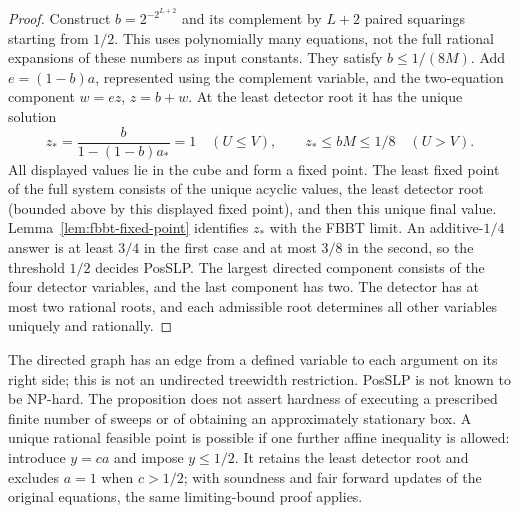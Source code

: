 \begin{proof}
Construct $b=2^{-2^{L+2}}$ and its complement by $L+2$ paired squarings
starting from $1/2$. This uses polynomially many equations, not the full
rational expansions of these numbers as input constants. They satisfy
$b\le1/(8M)$. Add $e=(1-b)a$, represented using the complement variable,
and the two-equation component $w=ez$, $z=b+w$.
At the least detector root it has the unique solution
\[
 z_*=\frac{b}{1-(1-b)a_*}
 =1\quad(U\le V),\qquad z_*\le bM\le1/8\quad(U>V).
\]
All displayed values lie in the cube and form a fixed point. The least
fixed point of the full system consists of the unique acyclic values,
the least detector root (bounded above by this displayed fixed point),
and then this unique final value. Lemma~\ref{lem:fbbt-fixed-point} identifies $z_*$
with the FBBT limit. An additive-$1/4$ answer is at least $3/4$ in the
first case and at most $3/8$ in the second, so the threshold $1/2$ decides
PosSLP. The largest directed component consists of the four detector
variables, and the last component has two. The detector has at most two rational roots, and each
admissible root determines all other variables uniquely and rationally.
\end{proof}
The directed graph has an edge from a defined variable to each argument
on its right side; this is not an undirected treewidth restriction.
PosSLP is not known to be NP-hard. The proposition does not assert
hardness of executing a prescribed finite number of sweeps or of obtaining
an approximately stationary box. A unique rational feasible point is
possible if one further affine inequality is allowed: introduce $y=ca$
and impose $y\le1/2$. It retains the least detector root and excludes
$a=1$ when $c>1/2$; with soundness and fair forward updates of the
original equations, the same limiting-bound proof applies.

